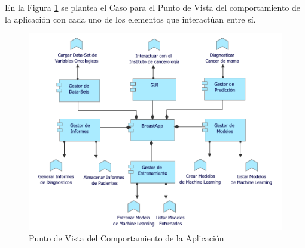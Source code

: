 En la Figura \ref{PvComportamientoApp} se plantea el Caso para el Punto de Vista del comportamiento de la aplicación con cada uno de los elementos que interactúan entre sí. 

\begin{figure}[h!]
	\centering
	\includegraphics[width=1\linewidth]{ARQUITECTURA/imgs/CapaAplicacion/1_PvComportamientoApp}
	\caption{Punto de Vista del Comportamiento de la  Aplicación}
	\label{PvComportamientoApp}
\end{figure}


